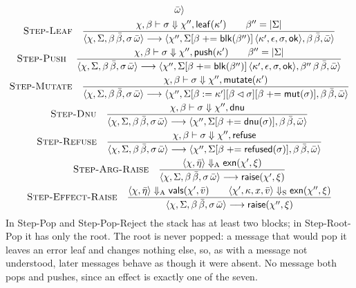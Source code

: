 \documentclass[11pt]{article}
\numberwithin{equation}{section}
\newcommand{\kw}[1]{\ensuremath{\mathsf{#1}}}
\newcommand{\rulelabel}[1]{\textsc{#1}}
\begin{document}
\begin{gather}
{        \bar\omega \rangle}
\\
\label{eq:step-leaf}
\rulelabel{Step-Leaf}\quad
\frac{\chi, \beta \vdash \sigma \Downarrow \chi'', \kw{leaf}(\kappa')
      \qquad \beta'' = |\Sigma|}
     {\langle \chi, \Sigma, \beta\,\bar\beta, \sigma\,\bar\omega \rangle
      \longrightarrow
      \langle \chi'', \Sigma[\beta \mathrel{+}= \kw{blk}(\beta'')]\,
        \langle \kappa', \epsilon, \sigma, \kw{ok} \rangle,
        \beta\,\bar\beta, \bar\omega \rangle}
\\
\label{eq:step-push}
\rulelabel{Step-Push}\quad
\frac{\chi, \beta \vdash \sigma \Downarrow \chi'', \kw{push}(\kappa')
      \qquad \beta'' = |\Sigma|}
     {\langle \chi, \Sigma, \beta\,\bar\beta, \sigma\,\bar\omega \rangle
      \longrightarrow
      \langle \chi'', \Sigma[\beta \mathrel{+}= \kw{blk}(\beta'')]\,
        \langle \kappa', \epsilon, \sigma, \kw{ok} \rangle,
        \beta''\,\beta\,\bar\beta, \bar\omega \rangle}
\\
\label{eq:step-mutate}
\rulelabel{Step-Mutate}\quad
\frac{\chi, \beta \vdash \sigma \Downarrow \chi'', \kw{mutate}(\kappa')}
     {\langle \chi, \Sigma, \beta\,\bar\beta, \sigma\,\bar\omega \rangle
      \longrightarrow
      \langle \chi'', \Sigma[\beta := \kappa'][\beta \lhd \sigma]
        [\beta \mathrel{+}= \kw{mut}(\sigma)],
        \beta\,\bar\beta, \bar\omega \rangle}
\\
\label{eq:step-dnu}
\rulelabel{Step-Dnu}\quad
\frac{\chi, \beta \vdash \sigma \Downarrow \chi'', \kw{dnu}}
     {\langle \chi, \Sigma, \beta\,\bar\beta, \sigma\,\bar\omega \rangle
      \longrightarrow
      \langle \chi'', \Sigma[\beta \mathrel{+}= \kw{dnu}(\sigma)],
        \beta\,\bar\beta, \bar\omega \rangle}
\\
\label{eq:step-refuse}
\rulelabel{Step-Refuse}\quad
\frac{\chi, \beta \vdash \sigma \Downarrow \chi'', \kw{refuse}}
     {\langle \chi, \Sigma, \beta\,\bar\beta, \sigma\,\bar\omega \rangle
      \longrightarrow
      \langle \chi'', \Sigma[\beta \mathrel{+}= \kw{refused}(\sigma)],
        \beta\,\bar\beta, \bar\omega \rangle}
\\
\label{eq:step-arg-raise}
\rulelabel{Step-Arg-Raise}\quad
\frac{\langle \chi, \bar\eta \rangle \Downarrow_{\mathrm{A}} \kw{exn}(\chi', \xi)}
     {\langle \chi, \Sigma, \beta\,\bar\beta, \sigma\,\bar\omega \rangle
      \longrightarrow \kw{raise}(\chi', \xi)}
\\
\label{eq:step-effect-raise}
\rulelabel{Step-Effect-Raise}\quad
\frac{\langle \chi, \bar\eta \rangle \Downarrow_{\mathrm{A}} \kw{vals}(\chi', \bar v)
      \qquad \langle \chi', \kappa, x, \bar v \rangle \Downarrow_{\mathrm{S}}
        \kw{exn}(\chi'', \xi)}
     {\langle \chi, \Sigma, \beta\,\bar\beta, \sigma\,\bar\omega \rangle
      \longrightarrow \kw{raise}(\chi'', \xi)}
\end{gather}
In Step-Pop and Step-Pop-Reject the stack has at least two blocks; in
Step-Root-Pop it has only the root.  The root is never popped: a message that would pop it leaves an
error leaf and changes nothing else, so, as with a message not understood,
later messages behave as though it were absent.  No message both pops and
pushes, since an effect is exactly one of the seven.
\end{document}
